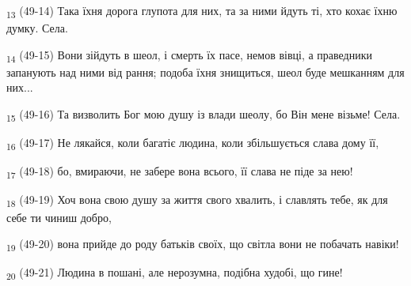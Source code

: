 \begin{tcolorbox}
\textsubscript{13} (49-14) Така їхня дорога глупота для них, та за ними йдуть ті, хто кохає їхню думку. Села.
\end{tcolorbox}
\begin{tcolorbox}
\textsubscript{14} (49-15) Вони зійдуть в шеол, і смерть їх пасе, немов вівці, а праведники запанують над ними від рання; подоба їхня знищиться, шеол буде мешканням для них...
\end{tcolorbox}
\begin{tcolorbox}
\textsubscript{15} (49-16) Та визволить Бог мою душу із влади шеолу, бо Він мене візьме! Села.
\end{tcolorbox}
\begin{tcolorbox}
\textsubscript{16} (49-17) Не лякайся, коли багатіє людина, коли збільшується слава дому її,
\end{tcolorbox}
\begin{tcolorbox}
\textsubscript{17} (49-18) бо, вмираючи, не забере вона всього, її слава не піде за нею!
\end{tcolorbox}
\begin{tcolorbox}
\textsubscript{18} (49-19) Хоч вона свою душу за життя свого хвалить, і славлять тебе, як для себе ти чиниш добро,
\end{tcolorbox}
\begin{tcolorbox}
\textsubscript{19} (49-20) вона прийде до роду батьків своїх, що світла вони не побачать навіки!
\end{tcolorbox}
\begin{tcolorbox}
\textsubscript{20} (49-21) Людина в пошані, але нерозумна, подібна худобі, що гине!
\end{tcolorbox}

